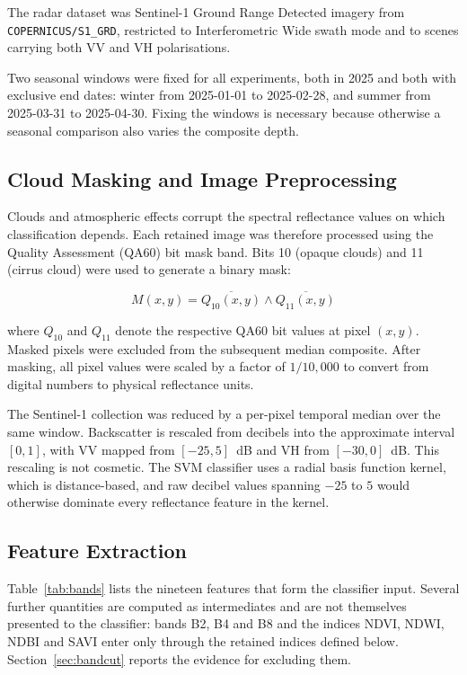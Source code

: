 \documentclass[conference]{IEEEtran}
\begin{document}
The radar dataset was Sentinel-1 Ground Range Detected imagery from
\texttt{COPERNICUS/S1\_GRD}, restricted to Interferometric Wide swath
mode and to scenes carrying both VV and VH polarisations.

Two seasonal windows were fixed for all experiments, both in 2025 and
both with exclusive end dates: winter from 2025-01-01 to 2025-02-28, and
summer from 2025-03-31 to 2025-04-30. Fixing the windows is necessary
because otherwise a seasonal comparison also varies the composite depth.

\subsection{Cloud Masking and Image Preprocessing}

Clouds and atmospheric effects corrupt the spectral reflectance values
on which classification depends. Each retained image was therefore
processed using the Quality Assessment (QA60) bit mask band. Bits 10
(opaque clouds) and 11 (cirrus cloud) were used to generate a binary
mask:

\begin{equation}
M(x,y) = \overline{Q_{10}(x,y)} \wedge \overline{Q_{11}(x,y)}
\end{equation}

where $Q_{10}$ and $Q_{11}$ denote the respective QA60 bit values at
pixel $(x,y)$. Masked pixels were excluded from the subsequent median
composite. After masking, all pixel values were scaled by a factor of
$1/10{,}000$ to convert from digital numbers to physical reflectance
units.

The Sentinel-1 collection was reduced by a per-pixel temporal median
over the same window. Backscatter is rescaled from decibels into the
approximate interval $[0,1]$, with VV mapped from $[-25,5]$~dB and VH
from $[-30,0]$~dB. This rescaling is not cosmetic. The SVM classifier
uses a radial basis function kernel, which is distance-based, and raw
decibel values spanning $-25$ to $5$ would otherwise dominate every
reflectance feature in the kernel.

\subsection{Feature Extraction}

Table~\ref{tab:bands} lists the nineteen features that form the
classifier input. Several further quantities are computed as
intermediates and are not themselves presented to the classifier: bands
B2, B4 and B8 and the indices NDVI, NDWI, NDBI and SAVI enter only
through the retained indices defined below.
Section~\ref{sec:bandcut} reports the evidence for excluding them.
\end{document}

